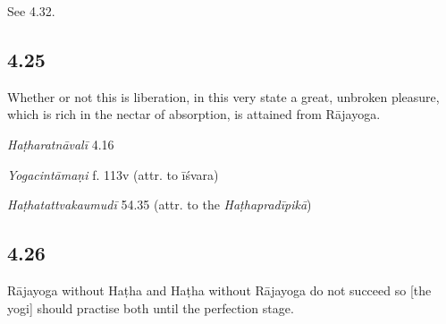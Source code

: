 \begin{ekdosis}
\begin{philcomm}[hp04_024_1]
See 4.32.
\end{philcomm}

\subsection*{4.25}
\begin{translation}[hp04_025]
Whether or not this is liberation, in this very state a great, unbroken pleasure, which is rich in the nectar of absorption, is attained from Rājayoga.
\end{translation}


\begin{testimonia}[hp04_025]
\emph{Haṭharatnāvalī} 4.16
\begin{versinnote}
\end{versinnote}

\emph{Yogacintāmaṇi} f. 113v (attr. to īśvara)
\begin{versinnote}
\end{versinnote}

\emph{Haṭhatattvakaumudī} 54.35 (attr. to the \emph{Haṭhapradīpikā})
\begin{versinnote}
\end{versinnote}
\end{testimonia}


\subsection*{4.26}
\begin{translation}[hp04_026]
Rājayoga without Haṭha and Haṭha without Rājayoga do not succeed so [the yogi] should practise both until the perfection stage.
\end{translation}


\end{ekdosis}
